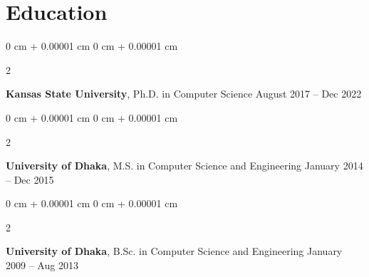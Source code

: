 \documentclass[10pt, letterpaper]{article}
\newenvironment{highlights}{
    \begin{itemize}[
        topsep=0.10 cm,
        parsep=0.10 cm,
        partopsep=0pt,
        itemsep=0pt,
        leftmargin=0 cm + 10pt
    ]
}{
    \end{itemize}
} %
\newenvironment{onecolentry}{
    \begin{adjustwidth}{
        0 cm + 0.00001 cm
    }{
        0 cm + 0.00001 cm
    }
}{
    \end{adjustwidth}
} %
\newenvironment{twocolentry}[2][]{
    \onecolentry
    \def\secondColumn{#2}
    \setcolumnwidth{\fill, 4.5 cm}
    \begin{paracol}{2}
}{
    \switchcolumn \raggedleft \secondColumn
    \end{paracol}
    \endonecolentry
} %
\begin{document}
\section{Education}
    
        \begin{twocolentry}{
            August 2017 – Dec 2022
        }
            \textbf{Kansas State University}, Ph.D. in Computer Science\end{twocolentry}


        \begin{twocolentry}{
            January 2014 – Dec 2015
        }
            \textbf{University of Dhaka}, M.S. in Computer Science and Engineering\end{twocolentry}


        \begin{twocolentry}{
            January 2009 – Aug 2013
        }
            \textbf{University of Dhaka}, B.Sc. in Computer Science and Engineering\end{twocolentry}
    
\end{document}
